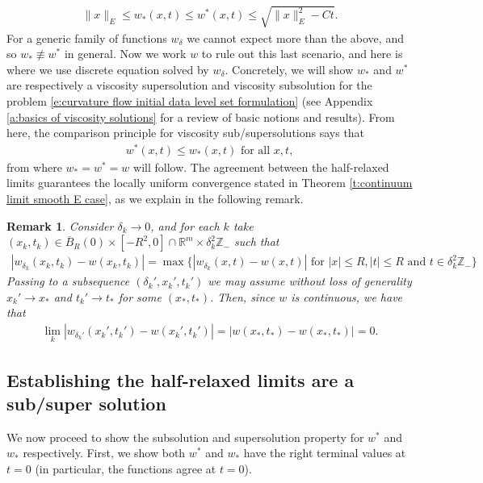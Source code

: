 \documentclass[reqno]{amsart}
\newtheorem{remark}[theorem]{Remark}
\numberwithin{equation}{section}
\begin{document}
\begin{align*}
  \|x\|_E \leq w_*(x,t) \leq w^*(x,t) \leq \sqrt{\|x\|_E^2-Ct}.
\end{align*} 
For a generic family of functions $w_\delta$ we cannot expect more than the above, and so $w_* \not\equiv w^*$ in general. Now we work $w$ to rule out this last scenario, and here is where we use discrete equation solved by $w_\delta$. Concretely, we will show $w_*$ and $w^*$ are respectively a viscosity supersolution and viscosity  subsolution  for the problem \eqref{e:curvature flow initial data level set formulation} (see Appendix \ref{a:basics of viscosity solutions} for a review of basic notions and results).  From here, the comparison principle for viscosity sub/supersolutions says that
\begin{align*}
    w^*(x,t) \leq w_*(x,t) \text{ for all } x,t,
\end{align*}
from where $w_* = w^* = w$ will follow. The agreement between the half-relaxed limits guarantees the locally uniform convergence stated in Theorem \ref{t:continuum limit smooth E case}, as we explain in the following remark. 

\begin{remark}\label{r:uniform convergence}
  Consider $\delta_k \to 0$, and for each $k$ take $(x_k,t_k) \in \overline{B}_R(0)\times [-R^2,0] \cap \mathbb{R}^m\times \delta_k^2\mathbb{Z}_-$ such that
    \begin{align*}
    |w_{\delta_k}(x_k,t_k)-w(x_k,t_k)| = \max \{ |w_{\delta_k}(x,t)-w(x,t)| \text{ for } |x| \leq R,|t|\leq R \text{ and } t \in \delta_k^2 \mathbb{Z}_-\}
  \end{align*}
  Passing to a subsequence $(\delta_k',x_k',t_k')$ we may assume without loss of generality $x_k'\to x_*$ and $t_k'\to t_*$ for some $(x_*,t_*)$. Then, since $w$ is continuous, we have that
  \begin{align*}
    \lim\limits_{k}|w_{\delta_k'}(x_k',t_k')-w(x_k',t_k')| = |w(x_*,t_*)-w(x_*,t_*)| = 0.
  \end{align*}    
\end{remark}

\subsection{Establishing the half-relaxed limits are a sub/super solution} We now proceed to show the subsolution and supersolution property for $w^*$ and $w_*$ respectively. First, we show both $w^*$ and $w_*$ have the right terminal values at $t=0$ (in particular, the functions agree at $t=0$).
\end{document}
